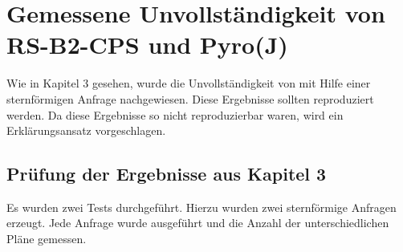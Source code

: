 \section{Gemessene Unvollständigkeit von RS-B2-CPS und Pyro(J)}

Wie in Kapitel 3 gesehen, wurde die Unvollständigkeit von \cite{bachelor}  mit Hilfe einer sternförmigen Anfrage nachgewiesen. Diese Ergebnisse sollten reproduziert werden. Da diese Ergebnisse so nicht reproduzierbar waren, wird ein Erklärungsansatz vorgeschlagen.

\subsection{Prüfung der Ergebnisse aus Kapitel 3}
Es wurden zwei Tests durchgeführt. Hierzu wurden zwei sternförmige Anfragen erzeugt. Jede Anfrage wurde ausgeführt und die Anzahl der unterschiedlichen Pläne gemessen.


